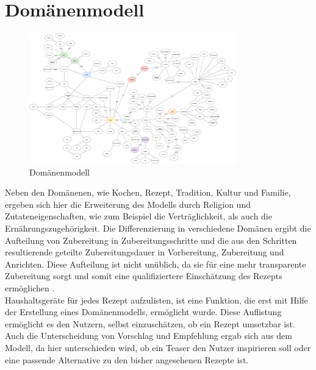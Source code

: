 \section{Domänenmodell}
\begin{figure}[h] %
    \centering
    \includegraphics[width=0.8\textwidth]{images/domainmodel.png}
    \caption[Domänenmodell]{Domänenmodell}
    \label{fig:Domaenenmodell}
\end{figure}
Neben den Domänenen, wie Kochen, Rezept, Tradition, Kultur und Familie, ergeben sich hier die Erweiterung des Modells durch Religion und Zutateneigenschaften, wie zum Beispiel die Verträglichkeit, als auch die Ernährungszugehörigkeit. 
Die Differenzierung in verschiedene Domänen ergibt die Aufteilung von Zubereitung in Zubereitungsschritte und die aus den Schritten resultierende geteilte Zubereitungsdauer in Vorbereitung, Zubereitung und Anrichten. 
Diese Aufteilung ist nicht unüblich, da sie für eine mehr transparente Zubereitung sorgt und somit eine qualifiziertere Einschätzung des Rezepts ermöglichen \citep{SlowBake13:online}.\\

Haushaltsgeräte für jedes Rezept aufzulisten, ist eine Funktion, die erst mit Hilfe der Erstellung eines Domänenmodells, ermöglicht wurde. Diese Auflistung ermöglicht es den Nutzern, selbst einzuschätzen, ob ein Rezept umsetzbar ist. Auch die Unterscheidung von Vorschlag und Empfehlung ergab sich aus dem Modell, da hier unterschieden wird, ob ein Teaser den Nutzer inspirieren soll oder eine passende Alternative zu den bisher angesehenen Rezepte ist.\\

